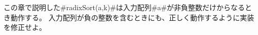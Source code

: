 %

\begin{exc}
この章で説明した#radixSort(a,k)#は入力配列#a#が非負整数だけからなるとき動作する。
入力配列が負の整数を含むときにも、正しく動作するように実装を修正せよ。
\end{exc}

